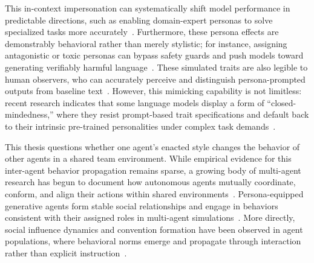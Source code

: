 This in-context impersonation can systematically shift model performance in predictable directions, such as enabling domain-expert personas to solve specialized tasks more accurately~\cite{salewski2023incontextimpersonationrevealslarge}.
Furthermore, these persona effects are demonstrably behavioral rather than merely stylistic; for instance, assigning antagonistic or toxic personas can bypass safety guards and push models toward generating verifiably harmful language~\cite{deshpande2023toxicitychatgptanalyzingpersonaassigned}.
These simulated traits are also legible to human observers, who can accurately perceive and distinguish persona-prompted outputs from baseline text~\cite{jiang2024personallminvestigatingabilitylarge}.
However, this mimicking capability is not limitless: recent research indicates that some language models display a form of ``closed-mindedness,'' where they resist prompt-based trait specifications and default back to their intrinsic pre-trained personalities under complex task demands~\cite{lacava2025openmodelsclosedminds}.

This thesis questions whether one agent's enacted style changes the behavior of other agents in a shared team environment.
While empirical evidence for this inter-agent behavior propagation remains sparse, a growing body of multi-agent research has begun to document how autonomous agents mutually coordinate, conform, and align their actions within shared environments~\cite{chen2023agentversefacilitatingmultiagentcollaboration, muralidharan2025lessonshumanteamsapplied, faulkner2026evaluatingcooperationllmsocial}.
Persona-equipped generative agents form stable social relationships and engage in behaviors consistent with their assigned roles in multi-agent simulations~\cite{park2023generativeagentsinteractivesimulacra}.
More directly, social influence dynamics and convention formation have been observed in agent populations, where behavioral norms emerge and propagate through interaction rather than explicit instruction~\cite{ashery2025emergentsocial, lin2025simulatingsocialinfluencedynamics}.

